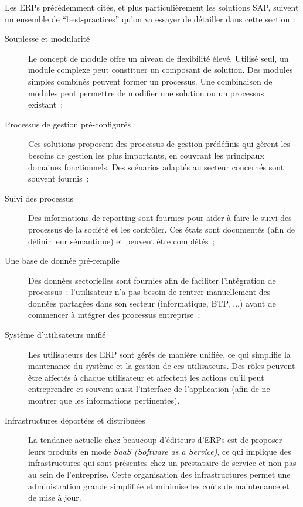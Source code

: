         Les ERPs précédemment cités, et plus particulièrement les solutions SAP, suivent un ensemble de ``best-practices'' qu'on va essayer de détailler dans cette section~:

        \begin{description}

            \item[Souplesse et modularité] Le concept de module offre un niveau de flexibilité élevé. Utilisé seul, un module complexe peut constituer un composant de solution. Des modules simples combinés peuvent former un processus. Une combinaison de modules peut permettre de modifier une solution ou un processus existant~;

            \item[Processus de gestion pré-configurés] Ces solutions proposent des processus de gestion prédéfinis qui gèrent les besoins de gestion les plus importants, en couvrant les principaux domaines fonctionnels. Des scénarios adaptés au secteur concernés sont souvent fournis~;

            \item[Suivi des processus] Des informations de reporting sont fournies pour aider à faire le suivi des processus de la société et les contrôler. Ces états sont documentés (afin de définir leur sémantique) et peuvent être complétés~;

            \item[Une base de donnée pré-remplie] Des données sectorielles sont fournies afin de faciliter l'intégration de processus~: l'utilisateur n'a pas besoin de rentrer manuellement des données partagées dans son secteur (informatique, BTP, ...) avant de commencer à intégrer des processus entreprise~;

            \item[Système d'utilisateurs unifié] Les utilisateurs des ERP sont gérés de manière unifiée, ce qui simplifie la mantenance du système et la gestion de ces utilisateurs. Des rôles peuvent être affectés à chaque utilisateur et affectent les actions qu'il peut entreprendre et souvent aussi l'interface de l'application (afin de ne montrer que les informations pertinentes).

            \item[Infrastructures déportées et distribuées] La tendance actuelle chez beaucoup d'éditeurs d'ERPs est de proposer leurs produits en mode \textit{SaaS (Software as a Service)}, ce qui implique des infrastructures qui sont présentes chez un prestataire de service et non pas au sein de l'entreprise. Cette organisation des infrastructures permet une administration grande simplifiée et minimise les coûts de maintenance et de mise à jour.

        \end{description}
